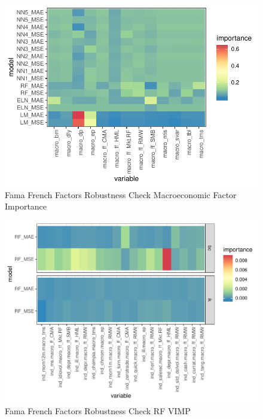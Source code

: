 \documentclass{article}
\begin{document}
\begin{figure}
	\includegraphics[]{../../Results/empirical_ff/empirical_sample_all_vi_macro.pdf}
	\caption{Fama French Factors Robustness Check Macroeconomic Factor Importance}
\end{figure}


\begin{figure}
	\includegraphics[]{../../Results/empirical_ff/empirical_vimp.pdf}
	\caption{Fama French Factors Robustness Check RF VIMP}
\end{figure}
\end{document}
